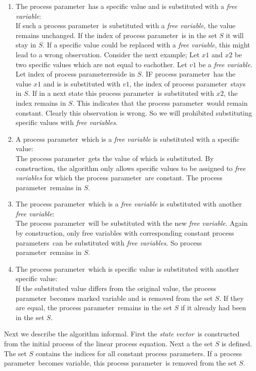 \index{}\documentclass[a4paper,10pt]{article}
\theoremstyle{plain}
\theoremstyle{definition}
\newcommand{\lpe}{linear process equation}
\newcommand{\pp}{process parameter}
\newcommand{\pps}{process parameters}
\newcommand{\ti}{\textit}
\newcommand{\sv}{\textit{state vector}}
\begin{document}
\begin{enumerate}
\item The \pp\ has a specific value and is substituted with a \ti{free variable}:\\
If such a \pp\ is substituted with a \ti{free variable}, the value remains unchanged. If the index of \pp\ is in the set $S$ it will stay in $S$. If a specific value could be replaced with a \ti{free variable}, this might lead to a wrong observation. Consider the next example; Let $x1$ and $x2$ be two specific values which are not equal to eachother. Let $v1$ be a \ti{free variable}. Let index of \pp reside in $S$. IF \pp\ has the value $x1$ and is is substituted with $v1$, the index of \pp\ stays in $S$. If in a next state this \pp\ is substituted with $x2$, the index remains in $S$. This indicates that the \pp\ would remain constant. Clearly this observation is wrong. So we will prohibited substituting specific values with \ti{free variables}.

\item A \pp\ which is a \ti{free variable} is substituted with a specific value:\\
The \pp\ gets the value of which is substituted. By construction, the algorithm only allows specific values to be assigned to \ti{free variables} for which the \pp\ are constant. The \pp\ remains in $S$.

\item The \pp\ which is a \ti{free variable} is substituted with another \ti{free variable}:\\
The \pp\ will be substituted with the new \ti{free variable}. Again by construction, only free variables with corresponding constant \pps\ can be substituted with \ti{free variables}. So \pp\ remains in $S$.

\item The \pp\ which is specific value is substituted with another specific value:\\
If the substituted value differs from the original value, the \pp\ becomes marked variable and is removed from the set $S$.
If they are equal, the \pp\ remains in the set $S$ if it already had been in the set $S$.
\end{enumerate}

Next we describe the algorithm informal.
First the \sv\ is constructed from the initial process of the \lpe. Next a the set $S$ is defined. The set $S$ contains the indices for all constant \pps . If a \pp\ becomes variable, this \pp\ is removed from the set $S$.
\end{document}
